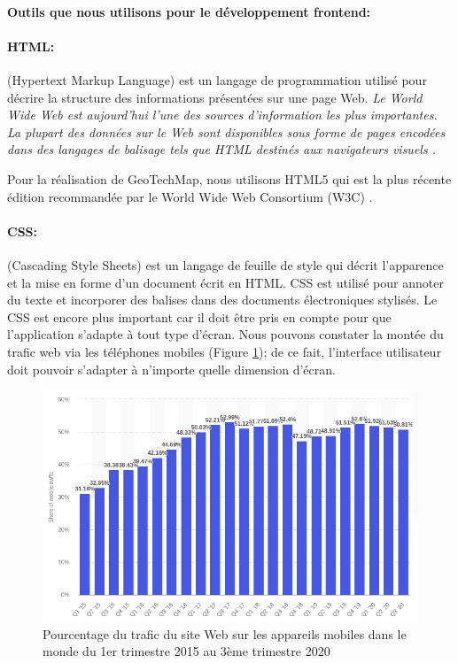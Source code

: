         \paragraph{Outils que nous utilisons pour le développement frontend:}
        \paragraph{HTML: }
        (Hypertext Markup Language) est un langage de programmation utilisé pour décrire 
        la structure des informations présentées sur une page Web. 
        \textit{Le World Wide Web est aujourd'hui l'une des sources d'information les plus 
        importantes. La plupart des données sur le Web sont disponibles sous forme de 
        pages encodées dans des langages de balisage tels que HTML destinés aux 
        navigateurs visuels \cite{yang2003html}.} 
        \par 
        Pour la réalisation de GeoTechMap, nous utilisons HTML5 qui est la plus récente
        édition recommandée par le World Wide Web Consortium (W3C) \cite{brooks2010world}.
        \paragraph{CSS: }
         (Cascading Style Sheets) est un langage de feuille de style qui décrit 
        l'apparence et la mise en forme d'un document écrit en HTML. CSS est utilisé 
        pour annoter du texte et incorporer des balises dans des documents électroniques stylisés.
        Le CSS est encore plus important car il doit être pris en compte pour que l'application s'adapte à tout 
        type d'écran. Nous pouvons constater la montée du trafic web via les téléphones mobiles (Figure \ref{fig:statMobile});
        de ce fait, l'interface utilisateur doit pouvoir s'adapter à n'importe quelle dimension d'écran.
        \begin{figure}[t]
                \centering
                \includegraphics[scale=0.5]{images/Implementation/statMobile.png}
                \caption{
                        Pourcentage du trafic du site Web sur les appareils 
                        mobiles dans le monde du 1er trimestre 2015 au 3ème trimestre 2020 \cite{linkstatmobile}}
                \label{fig:statMobile}
        \end{figure}
